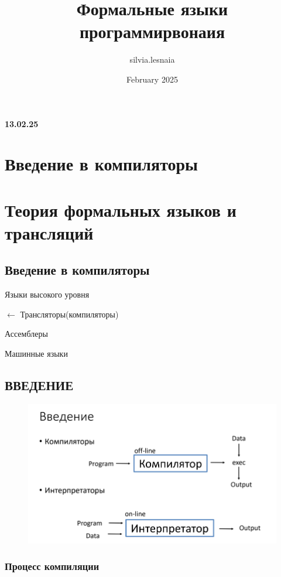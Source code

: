 \documentclass{article}
\title{Формальные языки программирвонаия}
\author{silvia.lesnaia }
\date{February 2025}
\begin{document}
\maketitle


\textbf{13.02.25}
\section{Введение в компиляторы}
\section{Теория формальных языков и трансляций}
    \subsection{Введение в компиляторы}

    Языки высокого уровня

    \hspace{50mm} $\leftarrow$ Трансляторы(компиляторы)

    Ассемблеры

    Машинные языки
    \subsection{ВВЕДЕНИЕ}
    
\begin{figure}[H]
    \centering
    \includegraphics[width=1\linewidth]{Снимок экрана 2025-02-13 083445.png}
\end{figure}

    \subsubsection{Процесс компиляции}
    
\end{document}
